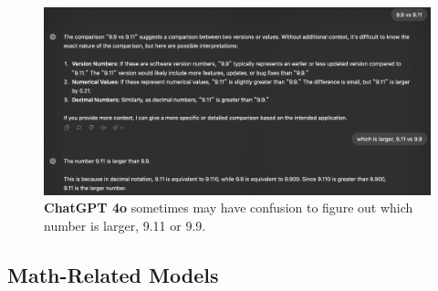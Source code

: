 \documentclass[10pt]{article}
\begin{document}
\begin{figure}[h]
    \centering
    \includegraphics[width=0.8\linewidth]{Figures/GPT4o math error.png}
    \caption{\textbf{ChatGPT 4o} sometimes may have confusion to figure out which number is larger, 9.11 or 9.9.}
    \label{fig:math error}
\end{figure}

\subsection{Math-Related Models}
 
\end{document}
